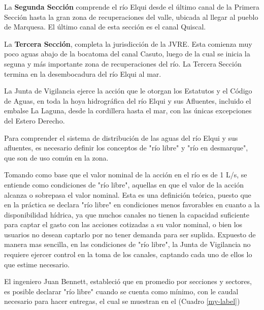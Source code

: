 \documentclass[10pt,]{article}
\begin{document}
La \textbf {Segunda Sección} comprende el río Elqui desde el último canal de la Primera Sección hasta la gran zona de recuperaciones del valle, ubicada al llegar al pueblo de Marquesa. El último canal de esta sección es el canal Quiscal.\bigskip

La \textbf {Tercera Sección}, completa la jurisdicción de la JVRE. Esta comienza muy poco aguas abajo de la bocatoma del canal Casuto, luego de la cual se inicia la seguna y más importante zona de recuperaciones del río. La Tercera Sección termina en la desembocadura del río Elqui al mar.\bigskip

La Junta de Vigilancia ejerce la acción que le otorgan los Estatutos y el Código de Aguas, en toda la hoya hidrográfica del río Elqui y sus Afluentes, incluido el embalse La Laguna, desde la cordillera hasta el mar, con las únicas excepciones del Estero Derecho.\bigskip

Para comprender el sistema de distribución de las aguas del río Elqui y sus afluentes, es necesario definir los conceptos de "río libre" y "río en desmarque", que son de uso común en la zona.\bigskip

Tomando como base que el valor nominal de la acción en el río es de 1 L/s, se entiende como condiciones de "río libre", aquellas en que el valor de la acción alcanza o sobrepasa el valor nominal. Esta es una definición teórica, puesto que en la práctica se declara "río libre" en condiciones menos favorables en cuanto a la disponibilidad hídrica, ya que muchos canales no tienen la capacidad suficiente para captar el gasto con las acciones cotizadas a su valor nominal, o bien los usuarios no desean captarlo por no tener demanda para ser suplida. Expuesto de manera mas sencilla, en las condiciones de "río libre", la Junta de Vigilancia no requiere ejercer control en la toma de los canales, captando cada uno de ellos lo que estime necesario.\bigskip

El ingeniero Juan Bennett, estableció que en promedio por secciones y sectores, es posible declarar "río libre" cuando se cuenta como mínimo, con le caudal necesario para hacer entregas, el cual se muestran en el (Cuadro \ref{my-label})
\end{document}
